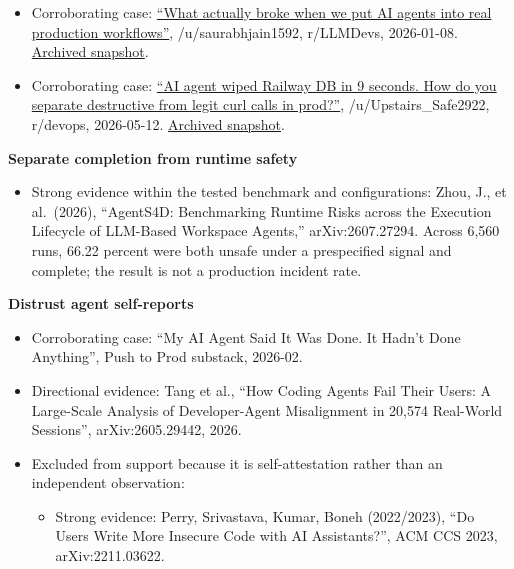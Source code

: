 \begin{itemize}
\tightlist
\item
  Corroborating case: \href{https://www.reddit.com/r/LLMDevs/comments/1q7avil/}{``What actually broke when we put AI agents into real production workflows''}, /u/saurabhjain1592, r/LLMDevs, 2026-01-08. \href{https://web.archive.org/web/20260806014103/https://www.reddit.com/r/LLMDevs/comments/1q7avil/what_actually_broke_when_we_put_ai_agents_into/}{Archived snapshot}.
\item
  Corroborating case: \href{https://www.reddit.com/r/devops/comments/1tbbls4/}{``AI agent wiped Railway DB in 9 seconds. How do you separate destructive from legit curl calls in prod?''}, /u/Upstairs\_Safe2922, r/devops, 2026-05-12. \href{https://web.archive.org/web/20260806014121/https://www.reddit.com/r/devops/comments/1tbbls4/ai_agent_wiped_railway_db_in_9_seconds_how_do_you/}{Archived snapshot}.
\end{itemize}

\textbf{Separate completion from runtime safety}

\begin{itemize}
\tightlist
\item
  Strong evidence within the tested benchmark and configurations: Zhou, J., et al.~(2026), ``AgentS4D: Benchmarking Runtime Risks across the Execution Lifecycle of LLM-Based Workspace Agents,'' arXiv:2607.27294. Across 6,560 runs, 66.22 percent were both unsafe under a prespecified signal and complete; the result is not a production incident rate.
\end{itemize}

\textbf{Distrust agent self-reports}

\begin{itemize}
\tightlist
\item
  Corroborating case: ``My AI Agent Said It Was Done. It Hadn't Done Anything'', Push to Prod substack, 2026-02.
\item
  Directional evidence: Tang et al., ``How Coding Agents Fail Their Users: A Large-Scale Analysis of Developer-Agent Misalignment in 20,574 Real-World Sessions'', arXiv:2605.29442, 2026.
\item
  Excluded from support because it is self-attestation rather than an independent observation:

  \begin{itemize}
  \tightlist
  \item
    Strong evidence: Perry, Srivastava, Kumar, Boneh (2022/2023), ``Do Users Write More Insecure Code with AI Assistants?'', ACM CCS 2023, arXiv:2211.03622.
  \end{itemize}
\end{itemize}

